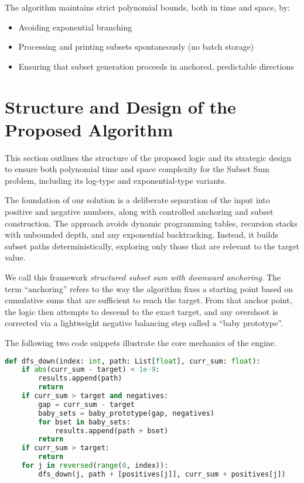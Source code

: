 \documentclass[11pt]{article}
\begin{document}
The algorithm maintains strict polynomial bounds, both in time and space, by:

\begin{itemize}
  \item Avoiding exponential branching
  \item Processing and printing subsets spontaneously (no batch storage)
  \item Ensuring that subset generation proceeds in anchored, predictable directions
\end{itemize}
\section{Structure and Design of the Proposed Algorithm}

This section outlines the structure of the proposed logic and its strategic design to ensure both polynomial time and space complexity for the Subset Sum problem, including its log-type and exponential-type variants.

The foundation of our solution is a deliberate separation of the input into positive and negative numbers, along with controlled anchoring and subset construction. The approach avoids dynamic programming tables, recursion stacks with unbounded depth, and any exponential backtracking. Instead, it builds subset paths deterministically, exploring only those that are relevant to the target value.

We call this framework \textit{structured subset sum with downward anchoring}. The term “anchoring” refers to the way the algorithm fixes a starting point based on cumulative sums that are sufficient to reach the target. From that anchor point, the logic then attempts to descend to the exact target, and any overshoot is corrected via a lightweight negative balancing step called a “baby prototype”.

The following two code snippets illustrate the core mechanics of the engine.

\begin{lstlisting}[language=Python, caption=Core downward anchoring and balancing logic]
def dfs_down(index: int, path: List[float], curr_sum: float):
    if abs(curr_sum - target) < 1e-9:
        results.append(path)
        return
    if curr_sum > target and negatives:
        gap = curr_sum - target
        baby_sets = baby_prototype(gap, negatives)
        for bset in baby_sets:
            results.append(path + bset)
        return
    if curr_sum > target:
        return
    for j in reversed(range(0, index)):
        dfs_down(j, path + [positives[j]], curr_sum + positives[j])
\end{lstlisting}
\end{document}
